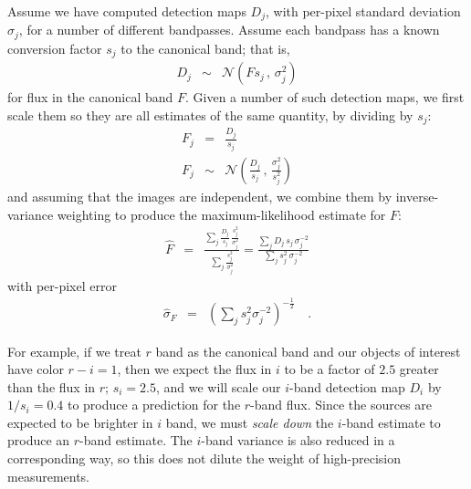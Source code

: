 \documentclass[letterpaper,preprint]{aastex62}
\newcommand{\drawnfrom}{\sim}
\newcommand{\gaussianN}{\mathcal{N}}
\newcommand{\gaussx}[2]{\gaussianN\!\left(#1 \, , \, #2\right)}
\begin{document}
\newcommand{\sigdj}{\sigma_{j}}

Assume we have computed detection maps $D_j$, with per-pixel standard deviation
$\sigdj$, for a number of different bandpasses.  Assume each
bandpass has a known conversion factor $s_j$ to the canonical band;
that is,
\begin{eqnarray}
  D_j & \drawnfrom & \gaussx{F s_j}{\sigdj^2}
\end{eqnarray}
for flux in the canonical band $F$.
%
Given a number of such detection maps, we first scale them so they are all estimates of the
same quantity, by dividing by $s_j$:
\begin{eqnarray}
  F_j & = & \frac{D_j}{s_j} \\
  F_j & \drawnfrom & \gaussx{\frac{D_j}{s_j}}{\frac{\sigdj^2}{s_j^2}}
\end{eqnarray}
and assuming that the images  are independent, we combine them by inverse-variance weighting
to produce the maximum-likelihood estimate for $F$:
\begin{eqnarray}
  \hat{F} &=& 
  \frac{\displaystyle\sum_j \frac{D_j}{s_j} \, \frac{s_j^2}{\sigdj^2}}%
       {\displaystyle\sum_j \frac{s_j^2}{\sigdj^2}}
       = 
       \frac{\displaystyle\sum_j D_j \, s_j \, \sigdj^{-2}}%
            {\displaystyle\sum_j s_j^2 \, \sigdj^{-2}}
\end{eqnarray}
with per-pixel error
\begin{eqnarray}
  \hat{\sigma}_F &=& \left( \sum_j s_j^2 \sigdj^{-2} \right)^{-\frac{1}{2}}
  \quad .
\end{eqnarray}


For example, if we treat $r$ band as the canonical band and our
objects of interest have color $r-i = 1$, then we expect the flux in
$i$ to be a factor of $2.5$ greater than the flux in $r$; $s_i = 2.5$,
and we will scale our $i$-band detection map $D_i$ by $1/s_i = 0.4$ to
produce a prediction for the $r$-band flux.  Since the sources are
expected to be brighter in $i$ band, we must \emph{scale down} the
$i$-band estimate to produce an $r$-band estimate.  The $i$-band
variance is also reduced in a corresponding way, so this does not
dilute the weight of high-precision measurements.
\end{document}
